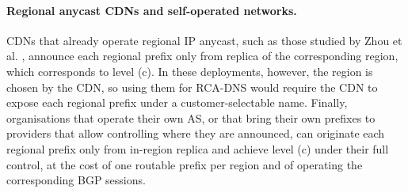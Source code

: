 \documentclass[
A4paper,                %
twoside,                %
openright,              %
chapterprefix=true,     %
12pt,                   %
headings=normal,        %
titlepage=on            %
]{book}
\begin{document}
\paragraph{Regional anycast CDNs and self-operated networks.} CDNs that already operate regional IP anycast, such as those studied by Zhou et al. \cite{Zhou2023RegionalPotentials}, announce each regional prefix only from replica of the corresponding region, which corresponds to level (c). In these deployments, however, the region is chosen by the CDN, so using them for RCA-DNS would require the CDN to expose each regional prefix under a customer-selectable name. Finally, organisations that operate their own AS, or that bring their own prefixes to providers that allow controlling where they are announced, can originate each regional prefix only from in-region replica and achieve level (c) under their full control, at the cost of one routable prefix per region and of operating the corresponding BGP sessions.
\end{document}
